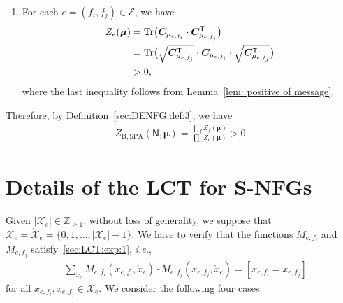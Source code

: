 \documentclass[journal]{IEEEtran}
\newcommand{\add}[1]{{\color{black}#1}}
\newcommand{\vect}[1]{ \bm{#1} }
\newcommand{\set}[1]{\mathcal{#1}}
\newcommand{\setEfull}{ \mathcal{E} }
\newcommand{\tran}{\mathsf{T}}
\newcommand{\vmu}{ \vect{ \mu } }
\newcommand{\graphN}{ \mathsf{N} }
\newcommand{\sZpp}{ \mathbb{Z}_{\geq 1} }
\newcommand{\ZBSPA}{ Z_{\mathrm{B,SPA}} }
\newcommand{\matr}[1]{\vect{#1}}
\newcommand{\LCTset}[1]{\mathring{\mathcal{#1}}}
\newcommand{\LCT}[1]{ \mathring{#1} }
\newcommand{\efi}{ e,f_i }
\newcommand{\efj}{ e,f_j }
\newcommand*{\ie}{\textit{i.e.}}
\begin{document}
\begin{appendices}
\begin{enumerate}
    \item  For each $ e = (f_{i},f_{j}) \in \setEfull $, we have
          \begin{align*}
            Z_e(\vmu)
             & = \Tr \bigl( \matr{C}_{\mu_{e,f_{i}}}
            \cdot \matr{C}_{\mu_{e,f_{j}}}^{\tran} \bigr)
            \\
             & = \Tr \bigl( \sqrt{ \matr{C}_{\mu_{e,f_{j}}}^{\tran} } \cdot
            \matr{C}_{\mu_{e,f_{i}}}
            \cdot \sqrt{ \matr{C}_{\mu_{e,f_{j}}}^{\tran} } \bigr)
            \\&> 0,
          \end{align*}
          where the last inequality follows from Lemma~\ref{lem: positive of message}.
  \end{enumerate}
  Therefore, by \add{Definition~\ref{sec:DENFG:def:3}}, we have
  \begin{align*}
    \ZBSPA(\graphN,\vmu)
    = \frac{\prod\limits_f Z_f(\vmu)}
      {\prod\limits_{e} Z_{e}(\vmu)}
    >0.
  \end{align*}

  \section{Details of the LCT for S-NFGs}
  \label{apx:LCT SNFGs}
  Given $ |\set{X}_e| \in \sZpp $, without loss of generality, we suppose that
  $\set{X}_e = \LCTset{X}_e = \{ 0, 1, \ldots, |\set{X}_e| \! - \! 1 \}$.  We have
  to verify that the functions $M_{\efi}$ and $M_{\efj}$
  satisfy~\eqref{sec:LCT:exp:1}, \ie,
  \begin{align*}
     & \sum_{\LCT{x}_e}
    M_{\efi}(x_{\efi}, \LCT{x}_e)
    \cdot
    M_{\efj}(x_{\efj}, \LCT{x}_e)
    = [x_{\efi} \! = \!  x_{\efj}]
  \end{align*}
  for all $x_{\efi}, x_{\efj} \in \set{X}_e.$
  We consider the following four cases.
  \begin{enumerate}


\end{enumerate}
\end{appendices}
\end{document}
